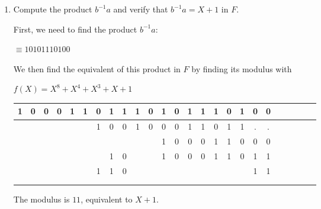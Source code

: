 \begin{problem}
\begin{enumerate}
\begin{Answer}
\end{Answer}
\newpage
\item Compute the product $b^{-1}a$ and verify that $b^{-1}a = X+1$ in $F$.
\begin{Answer}

\noindent
First, we need to find the product $b^{-1}a$:

\bigskip
\color{zaffre}
$\equiv 10101110100$
\color{black}

\bigskip

\noindent
We then find the equivalent of this product in $F$ by finding its modulus with

\noindent
$f(X)=X^8+X^4+X^3+X+1$

\bigskip
\color{zaffre}
\begin{tabular}{c@{\,}c@{\,}c@{\,}c@{\,}c@{\,}c@{\,}c@{\,}c@{\,}c@{\,} | c@{\,}c@{\,}c@{\,}c@{\,}c@{\,}c@{\,}c@{\,}c@{\,}c@{\,}c@{\,}c@{\,}c@{\,}c@{\,}c@{\,}c@{\,}c@{\,}}
  1 & 0 & 0 & 0 & 1 & 1 & 0 & 1 & 1     & 1 & 0 & 1 & 0 & 1 & 1 & 1 & 0 & 1 & 0 & 0\\
\hline{}
    &   &   &   &   &   & 1 & 0 & 0     & 1 & 0 & 0 & 0 & 1 & 1 & 0 & 1 & 1 &.  &.\\
    &   &   &   &   &   &   &   &       &   &   & 1 & 0 & 0 & 0 & 1 & 1 & 0 & 0 &0\\
    &   &   &   &   &   &   & 1 & 0     &   &   & 1 & 0 & 0 & 0 & 1 & 1 & 0 & 1 &1\\
\hline{}
    &   &   &   &   &   & 1 & 1 & 0     &   &   &   &   &   &   &   &   &   & 1 &1\\
\\
\\
\end{tabular}
\color{black}

\noindent
The modulus is $11$, equivalent to $X+1$.
\end{Answer}
\end{enumerate}
\end{problem}

